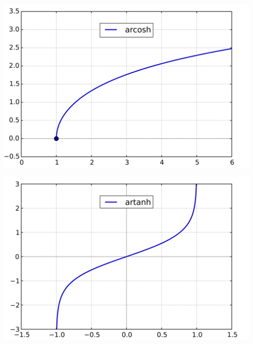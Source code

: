 \begin{multicols*}{3}
    \begin{center}
        \includegraphics[width=0.95\linewidth]{Bilder/arcosh.png}
    \end{center}

    \begin{center}
        \includegraphics[width=0.95\linewidth]{Bilder/artanh.png}
    \end{center}
\end{multicols*}

